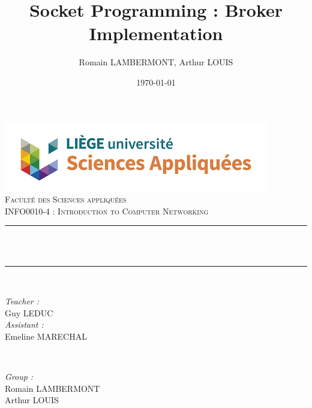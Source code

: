 \documentclass[12pt]{article}
\begin{document}

\title{Socket Programming : Broker Implementation}								%
\author{Romain LAMBERMONT, Arthur LOUIS}								%
\date{\today}											%

\makeatletter
\let\thetitle\@title
\let\theauthor\@author
\let\thedate\@date
\makeatother

\pagestyle{fancy}
\fancyhf{}
\rhead{\theauthor}
\lhead{\thetitle}
\cfoot{\thepage}

\begin{titlepage}
\centering
	\vspace*{0.5 cm}
	\includegraphics[scale = 0.7]{facsa.png}\\[1.0 cm]	%
	\textsc{\LARGE \newline\newline Faculté des Sciences appliquées}\\[2.0 cm]	%
\textsc{\Large  INFO0010-4 : Introduction to Computer Networking}\\[0.5 cm]				%
\rule{\linewidth}{0.2 mm} \\[0.4 cm]
{ \huge \bfseries \thetitle}\\
\rule{\linewidth}{0.2 mm} \\[1.5 cm]

\begin{minipage}{0.5\textwidth}
	\begin{flushleft} \large
		\emph{Teacher :}\\
		Guy LEDUC\\
		\vspace{0.5cm}
		\emph{Assistant :}\\
		Emeline MARECHAL\\
		\end{flushleft}
		\end{minipage}~
		\begin{minipage}{0.4\textwidth}

		\begin{flushright} \large
		\emph{Group :} \\
		Romain LAMBERMONT\\
		Arthur LOUIS\\
	\end{flushright}

\end{minipage}\\[2 cm]


	\thedate
\end{titlepage}
\end{document}
